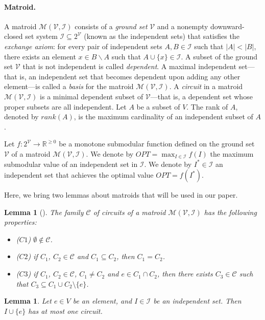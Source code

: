 \documentclass[11pt]{article}
\newcommand{\REAL}{\ensuremath{\mathbb{R}}}
\newtheorem{lemma}[theorem]{Lemma}
\newcommand{\matroid}{\mathcal{M}(\ground,\mathcal{I})}
\newcommand{\ground}{\ensuremath{\mathcal{V}}}
\begin{document}
\paragraph{Matroid.}
A matroid $\matroid$ consists of a \emph{ground set} $\ground$ and  
a nonempty downward-closed set system $\mathcal{I} \subseteq 2^{\ground}$  (known as the independent sets) that satisfies the \emph{exchange axiom}: 
for every pair of independent sets $A,B \in \mathcal{I}$ such that $|A| < |B| $, there exists an element $x\in B \backslash A$ such that $A \cup \{x\} \in \mathcal{I}$. 
A subset of the ground set $\ground$ that is not independent is called \emph{dependent}. 
A maximal independent set—that is, an independent set that becomes dependent upon adding any other element—is called a \emph{basis} for the matroid $\matroid$. 
A \emph{circuit} in a matroid $\matroid$ is a minimal dependent subset of $\ground$—that is, a dependent set whose proper subsets are all independent. 
Let $A$ be a subset of $V$. 
The rank of $A$, denoted by $rank(A)$, is the maximum cardinality of an independent subset of $A$. 

Let $f: 2^{\ground} \rightarrow \REAL^{\ge 0}$ be a monotone submodular function defined on 
the ground set $\ground$ of a matroid   $\matroid$. 
We denote by $OPT = \max_{I \in \mathcal{I}} f(I)$ the maximum submodular value of an independent set in $\mathcal{I}$. 
We denote by $I^* \in \mathcal{I}$ an independent set that achieves the optimal value $OPT = f(I^*)$. 

Here, we bring two lemmas about matroids that will be used in our paper. 
\begin{lemma}[\cite{DBLP:books/daglib/0070636}]
\label{lem:elimination:axiom}
The family $\mathcal{C}$ of circuits of a matroid $\matroid$ has the following properties:
\begin{itemize}
    \item ($C1$) $\emptyset \notin \mathcal{C}$.
    \item ($C2$) if $C_1$, $C_2 \in \mathcal{C}$ and $C_1 \subseteq C_2$, then $C_1=C_2$.
    \item ($C3$)  if $C_1$, $C_2 \in \mathcal{C}$, $C_1 \neq C_2$ and $e\in C_1 \cap C_2$, then there exists $C_3 \in \mathcal{C}$ such that $C_3 \subseteq C_1 \cup C_2 \setminus \{e\}$.
\end{itemize}
\end{lemma}

\begin{lemma}
\label{lem:<=1circuit}
Let $e\in V$ be an element, and $I \in \mathcal{I}$ be an independent set. Then $I \cup \{e\}$ has at most one circuit.
\end{lemma}
\end{document}
